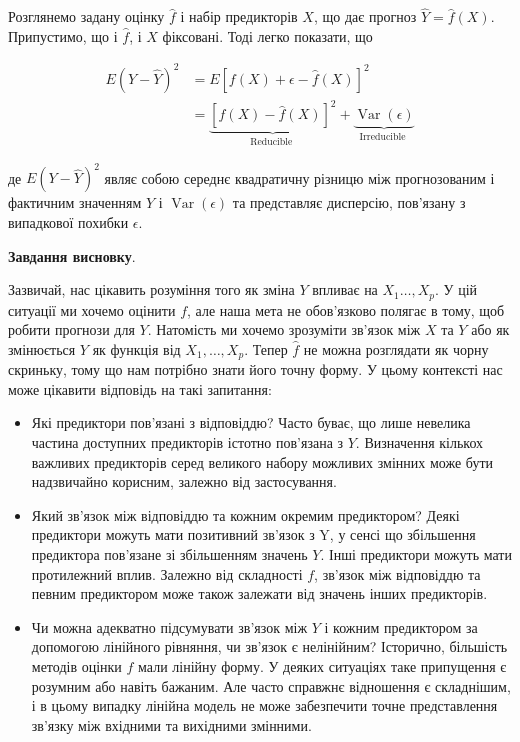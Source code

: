 \documentclass[14pt,a4paper]{extarticle}
\newcounter{e}
\numberwithin{equation}{section}
\numberwithin{figure}{section}
\begin{document}
    Розглянемо задану оцінку $\hat{f}$ і набір предикторів $X$, що дає прогноз $\hat{Y}=\hat{f}(X)$. Припустимо, що і $\hat{f}$, і $X$ фіксовані.
    Тоді легко показати, що
    
    $$
    \begin{aligned}
        E(Y-\hat{Y})^{2} &=E[f(X)+\epsilon-\hat{f}(X)]^{2} \\
        &=\underbrace{[f(X)-\hat{f}(X)]^{2}}_{\text {Reducible }}+\underbrace{\operatorname{Var}(\epsilon)}_{\text {Irreducible }}
    \end{aligned}
    $$
    
    де $E(Y-\hat{Y})^{2}$ являє собою середнє квадратичну різницю між прогнозованим і фактичним значенням $Y$ і $\operatorname{Var}(\epsilon)$ та представляє дисперсію, пов'язану з випадкової похибки $\epsilon$. \newline
    
    \textbf{Завдання висновку}. \newline
    
    Зазвичай, нас цікавить розуміння того як зміна $Y$ впливає на $X_{1} \ldots, X_{p}$. У цій ситуації ми хочемо оцінити $f$, але наша мета не обов'язково полягає в тому, щоб робити прогнози для $Y$. Натомість ми хочемо зрозуміти зв’язок між $X$ та $Y$ або як змінюється $Y$ як функція від $X_{1}, \ldots, X_{p}$. Тепер $\hat{f}$ не можна розглядати як чорну скриньку, тому що нам потрібно знати його точну форму. У цьому контексті нас може цікавити відповідь на такі запитання:
    \begin{itemize}
        \item Які предиктори пов’язані з відповіддю? Часто буває, що лише невелика частина доступних предикторів істотно пов’язана з $Y$. Визначення кількох важливих предикторів серед великого набору можливих змінних може бути надзвичайно корисним, залежно від застосування.
        \item Який зв’язок між відповіддю та кожним окремим предиктором? Деякі предиктори можуть мати позитивний зв’язок з Y,  у сенсі
        що збільшення предиктора пов'язане зі збільшенням значень $Y$. Інші предиктори можуть мати протилежний вплив. Залежно від складності $f$, зв'язок між відповіддю та певним предиктором може також залежати від значень інших предикторів.
        \item Чи можна адекватно підсумувати зв’язок між $Y$ і кожним предиктором за допомогою лінійного рівняння, чи зв’язок є нелінійним? Історично, більшість методів оцінки $f$ мали лінійну форму. У деяких ситуаціях таке припущення є розумним або навіть бажаним. Але часто справжнє відношення є складнішим, і в цьому випадку лінійна модель не може забезпечити точне представлення зв’язку між вхідними та вихідними змінними.
    \end{itemize} 
    
\end{document}
